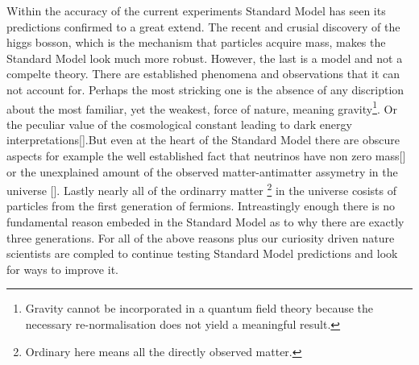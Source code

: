 Within the accuracy of the current experiments Standard Model has seen its predictions confirmed to a great extend.
The recent and crusial discovery of the higgs bosson, which is the mechanism that particles acquire mass, makes the Standard Model look
much more robust. However, the last is a model and not a compelte theory. There are established phenomena and observations that it can not
account for. Perhaps the most stricking one is the absence of any discription about the most familiar, yet the weakest, force of nature,
meaning gravity\footnote{Gravity cannot be incorporated in a quantum field theory because the necessary re-normalisation does not yield a
meaningful result.}.
Or the peculiar value of the cosmological constant leading to dark energy
interpretations[\cite{}].But even at the heart of the Standard Model there are obscure aspects for example the well established fact
that neutrinos have non zero mass[\cite{}] or the unexplained amount of the observed matter-antimatter assymetry in the universe [\cite{}].
Lastly nearly all of the ordinarry matter \footnote{Ordinary here means all the directly observed matter.} in the universe cosists of
particles from the first generation of fermions. Intreastingly enough there is no fundamental reason embeded in the Standard Model
as to why there are exactly three generations. For all of the above reasons plus our curiosity driven nature scientists are compled
to continue testing Standard Model predictions and look for ways to improve it.
